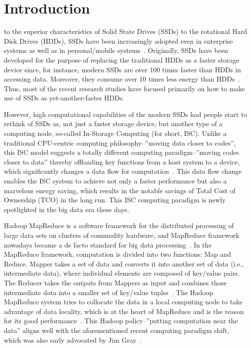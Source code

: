 

\section{Introduction}\label{sec:introduction}

 to the superior characteristics of Solid State Drives (SSDs) to the rotational Hard Disk Drives (HDDs), SSDs have been increasingly adopted even in enterprise systems as well as in personal/mobile systems~\cite{BPLRU:FAST:2008,CFTL:SIGMETRICS:2010,GORDON:ASPLOS:2009}. Originally, SSDs have been developed for the purpose of replacing the traditional HDDs as a faster storage device since, for instance, modern SSDs are over 100 times faster than HDDs in accessing data. Moreover, they consume over 10 times less energy than HDDs~\cite{Samsung:WhitePaper:2014}. Thus, most of the recent research studies have focused primarily on how to make use of SSDs as yet-another-faster HDDs.


However, high computational capabilities of the modern SSDs had people start to rethink of SSDs as, not just a faster storage device, but another type of a computing node, so-called In-Storage Computing (for short, ISC). Unlike a traditional CPU-centric computing philosophy--''moving data closer to codes'', this ISC model suggests a totally different computing paradigm--''moving codes closer to data'' thereby offloading key functions from a host system to a device, which significantly changes a data flow for computation~\cite{NearDataProcessing:Micro:2014}. This data flow change enables the ISC system to achieve not only a faster performance but also a marvelous energy saving, which results in the notable savings of Total Cost of Ownership (TCO) in the long run. This ISC computing paradigm is newly spotlighted in the big data era these days.


Hadoop MapReduce is a software framework for the distributed processing of large data sets on clusters of commodity hardware, and MapReduce framework nowadays became a de facto standard for big data processing~\cite{MapReduce:Tutorial}. In the MapReduce framework, computation is divided into two functions: Map and Reduce. Mapper takes a set of data and converts it into another set of data (i.e., intermediate data), where individual elements are composed of key/value pairs. The Reducer takes the outputs from Mappers as input and combines those intermediate data into a smaller set of key/value tuples~\cite{MapReduce:OSDI:2004}.
The Hadoop MapReduce system tries to collocate the data in a local computing node to take advantage of data locality, which is at the heart of MapReduce and is the reason for its good performance~\cite{TomWhite:HadoopDefinitiveGuide:2012}. This Hadoop policy--''putting computation near the data'' aligns well with the aforementioned recent computing paradigm shift, which was also early advocated by Jim Gray~\cite{JimGray:MSRTR:2003}.



